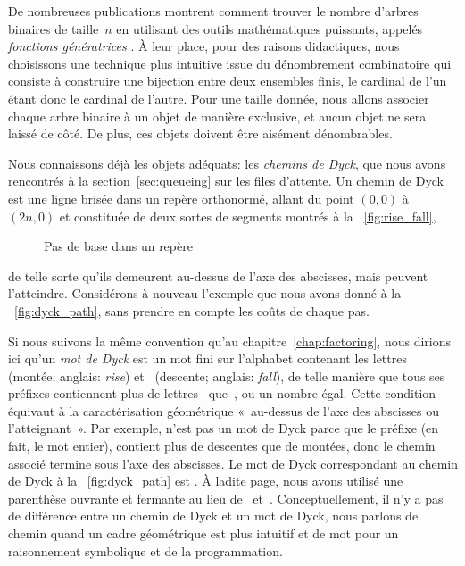 De nombreuses publications \cite[\S~2.3.4.4]{Knuth_1997}
\cite[chap.~5]{SedgewickFlajolet_1996} montrent comment trouver le
nombre d'arbres binaires de taille~\(n\) en utilisant des outils
mathématiques puissants, appelés \emph{fonctions génératrices}
\cite[chap.~7]{GrahamKnuthPatashnik_1994}. À leur place, pour des
raisons didactiques, nous choisissons une technique plus intuitive
issue du dénombrement combinatoire
qui consiste à construire une bijection entre deux ensembles finis, le
cardinal de l'un étant donc le cardinal de l'autre. Pour une taille
donnée, nous allons associer chaque arbre binaire à un objet de
manière exclusive, et aucun objet ne sera laissé de côté. De plus, ces
objets doivent être aisément dénombrables.

Nous connaissons déjà les objets adéquats: les \emph{chemins de
  Dyck}, que nous avons rencontrés à la
section~\ref{sec:queueing} sur les files d'attente. Un
chemin de Dyck est une ligne brisée dans un repère orthonormé, allant
du point \((0,0)\) à \((2n,0)\) et constituée de deux sortes de
segments montrés à la \fig~\vref{fig:rise_fall},
\begin{figure}[b]
\centering
{}
\qquad
{}
\caption{Pas de base dans un repère}
\label{fig:rise_fall}
\end{figure}
de telle sorte qu'ils demeurent au-dessus de l'axe des abscisses, mais
peuvent l'atteindre. Considérons à nouveau l'exemple que nous avons
donné à la \fig~\vref{fig:dyck_path}, sans prendre en compte les coûts
de chaque pas.

Si nous suivons la même convention qu'au
chapitre~\ref{chap:factoring}, nous dirions ici qu'un \emph{mot de
  Dyck} est un mot fini sur
l'alphabet contenant les lettres~ (montée; anglais:
\emph{rise}) et~ (descente;
anglais: \emph{fall}), de telle manière
que tous ses préfixes contiennent
plus de lettres~ que~, ou un nombre égal. Cette
condition équivaut à la caractérisation géométrique «~au-dessus de
l'axe des abscisses ou l'atteignant~». Par exemple,  n'est pas
un mot de Dyck parce que le préfixe  (en fait, le mot
entier), contient plus de descentes que de montées, donc le chemin
associé termine sous l'axe des abscisses. Le mot de Dyck correspondant
au chemin de Dyck à la \fig~\vref{fig:dyck_path} est
. À ladite page, nous avons utilisé une parenthèse
ouvrante et fermante au lieu de~
et~. Conceptuellement, il n'y a pas de différence entre un
chemin de Dyck et un mot de Dyck, nous parlons de chemin quand un
cadre géométrique est plus intuitif et de mot pour un raisonnement
symbolique et de la programmation.

